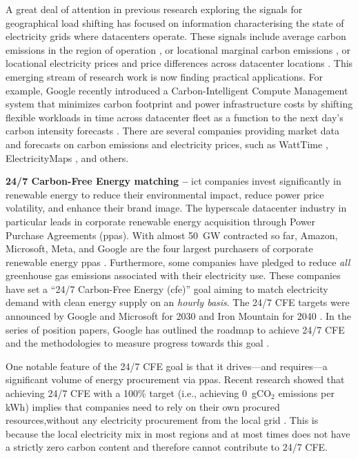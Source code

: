 A great deal of attention in previous research exploring the signals for geographical load shifting has focused on information characterising the state of electricity grids where datacenters operate. These signals include average carbon emissions in the region of operation \cite{zhengMitigatingCurtailmentCarbon2020}, or locational marginal carbon emissions \cite{lindbergEnvironmentalPotentialHyperScale2021}, or locational electricity prices and price differences across datacenter locations \cite{raoMinimizingElectricityCost2010,tranHowGeoDistributedData2016, zhangRemuneratingSpaceTime2022}. This emerging stream of research work is now finding practical applications. For example, Google recently introduced a Carbon-Intelligent Compute Management system that minimizes carbon footprint and power infrastructure costs by shifting flexible workloads in time  across datacenter fleet as a function to the next day's carbon intensity forecasts \cite{radovanovicIEEE2023}. There are several companies providing market data and forecasts on carbon emissions and electricity prices, such as WattTime \cite{WattTime}, ElectricityMaps \cite{ElectricityMaps}, and others.

\textbf{24/7 Carbon-Free Energy matching --} \gls{ict} companies invest significantly in renewable energy to reduce their environmental impact, reduce power price volatility, and enhance their brand image. The hyperscale datacenter industry in particular leads in corporate renewable energy acquisition through Power Purchase Agreements (\gls{ppa}s). With almost 50~GW contracted so far, Amazon, Microsoft, Meta, and Google are the four largest purchasers of corporate renewable energy \gls{ppa}s \cite{ieaDataCentresData2023}. Furthermore, some companies have pledged to reduce \textit{all} greenhouse gas emissions associated with their electricity use. These companies have set a \enquote{24/7 Carbon-Free Energy (\gls{cfe})} goal aiming to match electricity demand with clean energy supply on an \textit{hourly basis}. The 24/7 CFE targets were announced by Google and Microsoft for 2030 and Iron Mountain for 2040 \cite{google-247by2030, Microsoft-vision, IronMountainSustainability}. In the series of position papers, Google has outlined the roadmap to achieve 24/7 CFE and the methodologies to measure progress towards this goal \cite{google-methodologies,google-PolicyRoadmap}.

One notable feature of the 24/7 CFE goal is that it drives---and requires---a significant volume of energy procurement via \gls{ppa}s. Recent research showed that achieving 24/7 CFE with a 100\% target (i.e., achieving 0~gCO$_2$ emissions per kWh) implies that companies need to rely on their own procured resources,without any electricity procurement from the local grid \cite{riepinMeansCostsSystemlevel2023, riepin-zenodo-systemlevel247}. This is because the local electricity mix in most regions and at most times does not have a strictly zero carbon content and therefore cannot contribute to 24/7 CFE.


